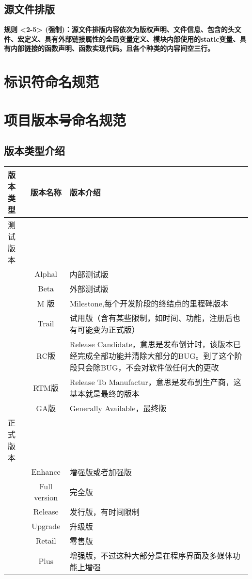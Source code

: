 \documentclass[UTF8,a4paper,12pt]{article}
\begin{document}
	\subsection{源文件排版}
	\textbf{规则 <2-5> (强制)：源文件排版内容依次为版权声明、文件信息、包含的头文件、宏定义、具有外部链接属性的全局变量定义、模块内部使用的static变量、具有内部链接的函数声明、函数实现代码。且各个种类的内容间空三行。}
	\newpage
		
	\section{标识符命名规范}
	\newpage
	
	\section{项目版本号命名规范}
	\subsection{版本类型介绍}
	\begin{center}
		\begin{tabular}{|l|c|p{10cm}|}  
			\hline
			版本类型 & 版本名称 & 版本介绍 \\ \hline
			测试版本 & & \\ \hline
			& Alphal & 内部测试版 \\ \hline
			& Beta & 外部测试版 \\ \hline
			& M 版 & Milestone,每个开发阶段的终结点的里程碑版本 \\ \hline
			& Trail & 试用版（含有某些限制，如时间、功能，注册后也有可能变为正式版） \\ \hline
			& RC版 & Release Candidate，意思是发布倒计时，该版本已经完成全部功能并清除大部分的BUG。到了这个阶段只会除BUG，不会对软件做任何大的更改 \\ \hline
			& RTM版 & Release To Manufactur，意思是发布到生产商，这基本就是最终的版本 \\ \hline
			& GA版 & Generally Available，最终版 \\ \hline
			正式版本 & & \\ \hline
			& Enhance & 增强版或者加强版 \\ \hline
			& Full version & 完全版 \\ \hline
			& Release & 发行版，有时间限制 \\ \hline
			& Upgrade & 升级版 \\ \hline
			& Retail & 零售版 \\ \hline
			& Plus & 增强版，不过这种大部分是在程序界面及多媒体功能上增强 \\ \hline
		\end{tabular}
	\end{center}
\end{document}
